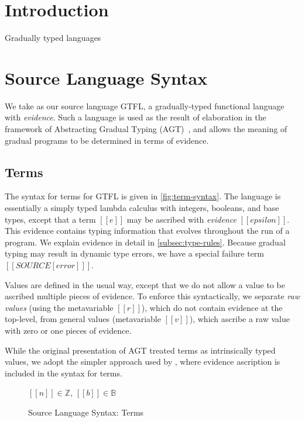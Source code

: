 \documentclass[11pt]{article}
\begin{document}
\section{Introduction}

Gradually typed languages

\section{Source Language Syntax}

We take as our source language GTFL, a gradually-typed functional language
with \textit{evidence}. Such a language is used as the result of
elaboration in the framework of Abstracting Gradual Typing (AGT)~\citep{agt},
and allows the meaning of gradual programs to be determined in terms of evidence.

\subsection{Terms}
 
The syntax for terms for GTFL is given in \autoref{fig:term-syntax}.
The language is essentially a simply typed lambda calculus with
integers, booleans, and base types, except that a term $[[e]]$ 
may be ascribed with \textit{evidence} $[[epsilon]]$.
This evidence contains typing information that evolves throughout the run of a program.
We explain evidence in detail in \autoref{subsec:type-rules}.
Because gradual typing may result in dynamic type errors, we have a special failure term $[[ SOURCE[error] ]]$.

Values are defined in the usual way, except that we do not allow a value to be
ascribed multiple pieces of evidence. To enforce this syntactically, we separate \textit{raw values}
(using the metavariable $[[r]]$), which do not contain evidence at the top-level,
from general values (metavariable $[[v]]$), which ascribe a raw value with zero or one pieces of evidence.

While the original presentation of AGT treated terms as intrinsically typed values,
we adopt the simpler approach used by \citet{Toro:2019:GPR:3302515.3290330}, where evidence ascription
is included in the syntax for terms. 

\begin{figure}[H] 
	$[[n]] \in \mathbb{Z}$, $[[b]]\in\mathbb{B}$

	\caption{Source Language Syntax: Terms}
	\label{fig:term-syntax}
\end{figure}
\end{document}
